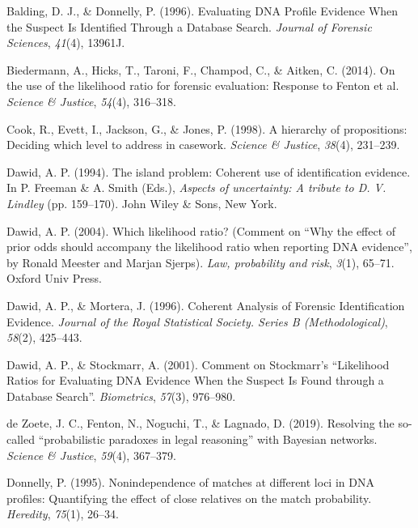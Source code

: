 \documentclass[10pt,dvipsnames,enabledeprecatedfontcommands]{scrartcl}
\begin{document}
\leavevmode\hypertarget{ref-balding1996EvaluatingDNAProfilea}{}%
Balding, D. J., \& Donnelly, P. (1996). Evaluating DNA Profile Evidence
When the Suspect Is Identified Through a Database Search. \emph{Journal
of Forensic Sciences}, \emph{41}(4), 13961J.

\leavevmode\hypertarget{ref-biedermann2014UseLikelihoodRatio}{}%
Biedermann, A., Hicks, T., Taroni, F., Champod, C., \& Aitken, C.
(2014). On the use of the likelihood ratio for forensic evaluation:
Response to Fenton et al. \emph{Science \& Justice}, \emph{54}(4),
316--318.

\leavevmode\hypertarget{ref-Cook1998hierarchy}{}%
Cook, R., Evett, I., Jackson, G., \& Jones, P. (1998). A hierarchy of
propositions: Deciding which level to address in casework. \emph{Science
\& Justice}, \emph{38}(4), 231--239.

\leavevmode\hypertarget{ref-dawid1994island}{}%
Dawid, A. P. (1994). The island problem: Coherent use of identification
evidence. In P. Freeman \& A. Smith (Eds.), \emph{Aspects of
uncertainty: A tribute to D. V. Lindley} (pp. 159--170). John Wiley \&
Sons, New York.

\leavevmode\hypertarget{ref-dawid2004likelihood}{}%
Dawid, A. P. (2004). Which likelihood ratio? (Comment on ``Why the
effect of prior odds should accompany the likelihood ratio when
reporting DNA evidence'', by Ronald Meester and Marjan Sjerps).
\emph{Law, probability and risk}, \emph{3}(1), 65--71. Oxford Univ
Press.

\leavevmode\hypertarget{ref-dawid1996CoherentAnalysisForensic}{}%
Dawid, A. P., \& Mortera, J. (1996). Coherent Analysis of Forensic
Identification Evidence. \emph{Journal of the Royal Statistical Society.
Series B (Methodological)}, \emph{58}(2), 425--443.

\leavevmode\hypertarget{ref-dawid2001CommentStockmarrLikelihood}{}%
Dawid, A. P., \& Stockmarr, A. (2001). Comment on Stockmarr's
``Likelihood Ratios for Evaluating DNA Evidence When the Suspect Is
Found through a Database Search''. \emph{Biometrics}, \emph{57}(3),
976--980.

\leavevmode\hypertarget{ref-dezoete2019ResolvingSocalledProbabilistic}{}%
de Zoete, J. C., Fenton, N., Noguchi, T., \& Lagnado, D. (2019).
Resolving the so-called ``probabilistic paradoxes in legal reasoning''
with Bayesian networks. \emph{Science \& Justice}, \emph{59}(4),
367--379.

\leavevmode\hypertarget{ref-donnelly1995NonindependenceMatchesDifferent}{}%
Donnelly, P. (1995). Nonindependence of matches at different loci in DNA
profiles: Quantifying the effect of close relatives on the match
probability. \emph{Heredity}, \emph{75}(1), 26--34.
\end{document}
